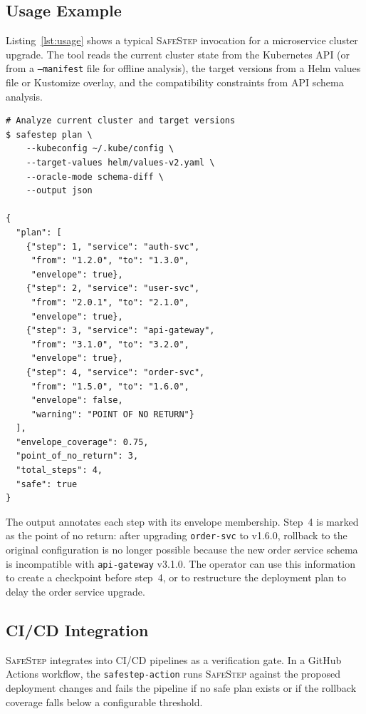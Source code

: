 \documentclass[10pt,twocolumn]{article}
\newcommand{\safestep}{\textsc{SafeStep}}
\begin{document}
\subsection{Usage Example}

Listing~\ref{lst:usage} shows a typical \safestep{} invocation
for a microservice cluster upgrade. The tool reads the current
cluster state from the Kubernetes API (or from a
\texttt{--manifest} file for offline analysis), the target
versions from a Helm values file or Kustomize overlay, and
the compatibility constraints from API schema analysis.

\begin{lstlisting}[caption={Typical \safestep{} CLI usage.},
  label=lst:usage]
# Analyze current cluster and target versions
$ safestep plan \
    --kubeconfig ~/.kube/config \
    --target-values helm/values-v2.yaml \
    --oracle-mode schema-diff \
    --output json

{
  "plan": [
    {"step": 1, "service": "auth-svc",
     "from": "1.2.0", "to": "1.3.0",
     "envelope": true},
    {"step": 2, "service": "user-svc",
     "from": "2.0.1", "to": "2.1.0",
     "envelope": true},
    {"step": 3, "service": "api-gateway",
     "from": "3.1.0", "to": "3.2.0",
     "envelope": true},
    {"step": 4, "service": "order-svc",
     "from": "1.5.0", "to": "1.6.0",
     "envelope": false,
     "warning": "POINT OF NO RETURN"}
  ],
  "envelope_coverage": 0.75,
  "point_of_no_return": 3,
  "total_steps": 4,
  "safe": true
}
\end{lstlisting}

\noindent
The output annotates each step with its envelope membership.
Step~4 is marked as the point of no return: after upgrading
\texttt{order-svc} to v1.6.0, rollback to the original
configuration is no longer possible because the new order
service schema is incompatible with \texttt{api-gateway}
v3.1.0. The operator can use this information to create a
checkpoint before step~4, or to restructure the deployment
plan to delay the order service upgrade.

\subsection{CI/CD Integration}

\safestep{} integrates into CI/CD pipelines as a verification
gate. In a GitHub Actions workflow, the \texttt{safestep-action}
runs \safestep{} against the proposed deployment changes and
fails the pipeline if no safe plan exists or if the rollback
coverage falls below a configurable threshold.
\end{document}
